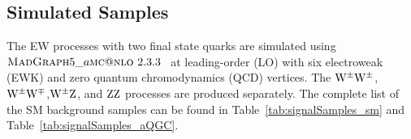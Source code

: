 \subsection{Simulated Samples}
The EW  processes with two final state quarks are simulated using \newline $\textsc{MadGraph}{}5\_a\textsc{mc}@\textsc{nlo}~2.3.3$~\cite{Alwall:2014} at leading-order (LO) with six electroweak (EWK) and zero quantum chromodynamics (QCD) vertices. The $\mathrm{W}^{\pm}\mathrm{W}^{\pm}$, $\mathrm{W}^{\pm}\mathrm{W}^{\mp}$,$\mathrm{W}^{\pm}\mathrm{Z}$, and $\mathrm{Z}\mathrm{Z}$ processes are produced separately. The complete list of the SM background samples can be found in Table~\ref{tab:signalSamples_sm} and Table~\ref{tab:signalSamples_aQGC}.
%
